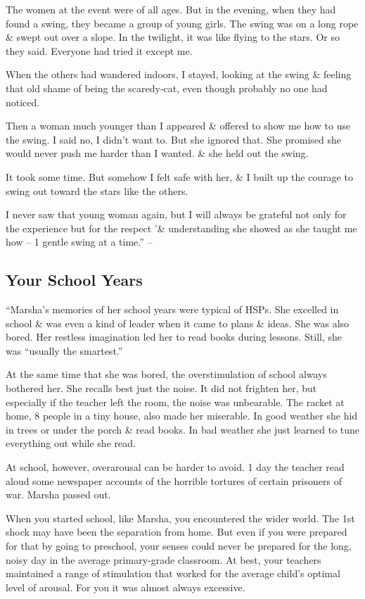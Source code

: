 \documentclass{article}
\numberwithin{equation}{section}
\begin{document}
The women at the event were of all ages. But in the evening, when they had found a swing, they became a group of young girls. The swing was on a long rope \& swept out over a slope. In the twilight, it was like flying to the stars. Or so they said. Everyone had tried it except me.

When the others had wandered indoors, I stayed, looking at the swing \& feeling that old shame of being the scaredy-cat, even though probably no one had noticed.

Then a woman much younger than I appeared \& offered to show me how to use the swing. I said no, I didn't want to. But she ignored that. She promised she would never push me harder than I wanted. \& she held out the swing.

It took some time. But somehow I felt safe with her, \& I built up the courage to swing out toward the stars like the others.

I never saw that young woman again, but I will always be grateful not only for the experience but for the respect '\& understanding she showed as she taught me how -- 1 gentle swing at a time.'' -- \cite[pp. 112--113]{Aron2013}

\subsection{Your School Years}
``Marsha's memories of her school years were typical of HSPs. She excelled in school \& was even a kind of leader when it came to plans \& ideas. She was also bored. Her restless imagination led her to read books during lessons. Still, she was ``usually the smartest.''

At the same time that she was bored, the overstimulation of school always bothered her. She recalls best just the noise. It did not frighten her, but especially if the teacher left the room, the noise was unbearable. The racket at home, 8 people in a tiny house, also made her miserable. In good weather she hid in trees or under the porch \& read books. In bad weather she just learned to tune everything out while she read.

At school, however, overarousal can be harder to avoid. 1 day the teacher read aloud some newspaper accounts of the horrible tortures of certain prisoners of war. Marsha passed out.

When you started school, like Marsha, you encountered the wider world. The 1st shock may have been the separation from home. But even if you were prepared for that by going to preschool, your senses could never be prepared for the long, noisy day in the average primary-grade classroom. At best, your teachers maintained a range of stimulation that worked for the average child's optimal level of arousal. For you it was almost always excessive.
\end{document}
